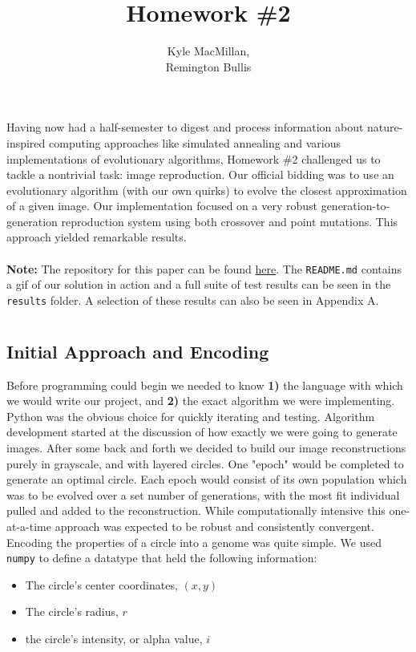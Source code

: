 \documentclass[12pt]{article}
\title{Homework \#2}
\author{Kyle MacMillan, \\Remington Bullis}
\begin{document}
\maketitle

Having now had a half-semester to digest and process information about nature-inspired computing approaches like simulated annealing and various implementations of evolutionary algorithms, Homework \#2 challenged us to tackle a nontrivial task: image reproduction. Our official bidding was to use an evolutionary algorithm (with our own quirks)  to evolve the closest approximation of a given image. Our implementation focused on a very robust generation-to-generation reproduction system using both crossover and point mutations. This approach yielded remarkable results. 
\\ \\
\textbf{Note: }The repository for this paper can be found \href{https://github.com/macattackftw/ncGA}{here}. 
The \verb|README.md| contains a gif of our solution in action and a full suite of test results can be seen in the \verb|results| folder. A selection of these results can also be seen in Appendix A. 

\section{} %

\subsection{Initial Approach and Encoding}
Before programming could begin we needed to know \textbf{1)} the language with which we would write our project, and \textbf{2)} the exact algorithm we were implementing. Python was the obvious choice for quickly iterating and testing. Algorithm development started at the discussion of how exactly we were going to generate images. After some back and forth we decided to build our image reconstructions purely in grayscale, and with layered circles. One "epoch" would be completed to generate an optimal circle. Each epoch would consist of its own population which was to be evolved over a set number of generations, with the most fit individual pulled and added to the reconstruction. While computationally intensive this one-at-a-time approach was expected to be robust and consistently convergent. 
\\
Encoding the properties of a circle into a genome was quite simple. We used \verb|numpy| to define a datatype that held the following information:
\begin{itemize}
\item The circle's center coordinates, $(x, y)$
\item The circle's radius, $r$
\item the circle's intensity, or alpha value, $i$
\end{itemize}
\end{document}
